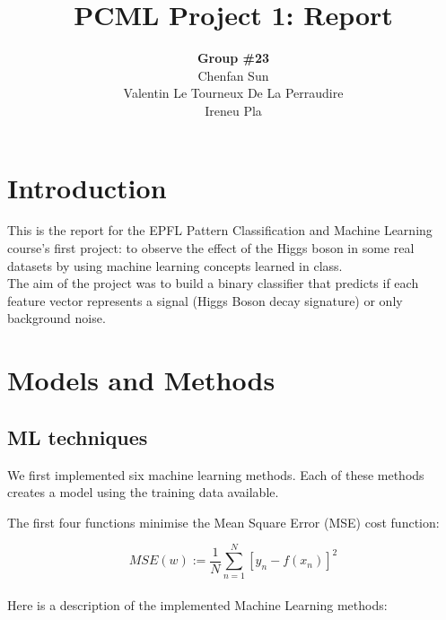 \documentclass[10pt,conference,compsocconf]{IEEEtran}
\begin{document}
\title{PCML Project 1: Report}

\author{
  \textbf{Group \#23} \\
  Chenfan Sun \\
  Valentin Le Tourneux De La Perraudire \\
  Ireneu Pla
}

\maketitle

\section{Introduction}

This is the report for the EPFL Pattern Classification and Machine Learning course's first project: to observe the effect of the Higgs boson in some real datasets by using machine learning concepts learned in class. \\
The aim of the project was to build a binary classifier that predicts if each feature vector represents a signal (Higgs Boson decay signature) or only background noise.

\section{Models and Methods}

\subsection{ML techniques}

We first implemented six machine learning methods. Each of these methods creates a model using the training data available.

The first four functions minimise the Mean Square Error (MSE) cost function:

$$MSE(w) := \frac{1}{N}\sum\limits_{n=1}^N {[y_n - f(x_n)]}^2$$ \\

Here is a description of the implemented Machine Learning methods:
\end{document}
